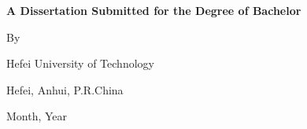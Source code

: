 \begin{titlepage}
\centering
{
\parskip=0pt \linespread{1.25}
\sanhao \bfseries{A Dissertation Submitted for the Degree of Bachelor}\vspace{4.7cm}

\Large \bfseries{\titleEn} \vspace{1.8cm}}

{\sanhao By

\studentNameEn
\vfill
Hefei University of Technology

Hefei, Anhui, P.R.China

\finishedMonth\enspace Month, \finishedYear\enspace Year
\vspace{3cm}
}

\end{titlepage}
